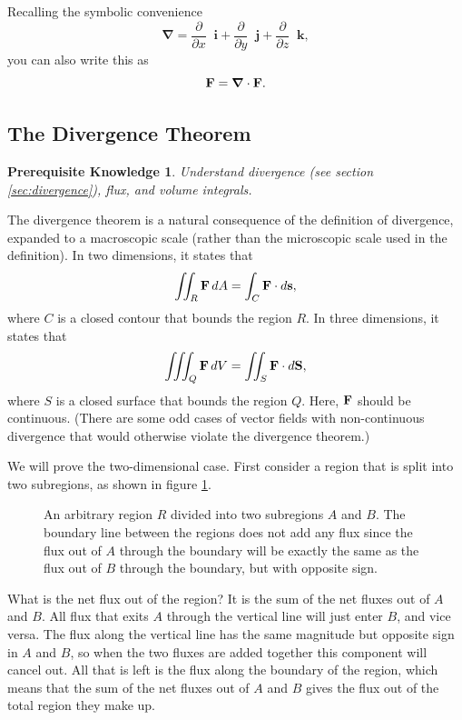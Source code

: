 \documentclass{myarticle}
\let\div\relax
\DeclareMathOperator{\div}{div}
\renewcommand{\vec}[1]{\mathbf{#1}}
\newcommand{\unitvector}[1]{
  \mathop{}\!\vec{#1}
}
\newcommand{\ih}{\unitvector{i}}
\newcommand{\jh}{\unitvector{j}}
\newcommand{\kh}{\unitvector{k}}
\newcommand{\del}{\boldsymbol{\nabla}}
\theoremstyle{nospace}
\newtheorem*{oldprereq}{Prerequisite Knowledge}
\newenvironment{prereq}{\begin{mdframed}\begin{oldprereq}}{\end{oldprereq}\end{mdframed}}
\newtheorem{old series theorem}{Theorem}
\newenvironment{series theorem}{\begin{mdframed}\begin{old series theorem}}{\end{old series theorem}\end{mdframed}}
\begin{document}
Recalling the symbolic convenience \[ \del = \frac{\partial}{\partial x} \ih + \frac{\partial}{\partial y} \jh + \frac{\partial}{\partial z} \kh, \] you can also write this as \[ \div \vec{F} = \del \cdot \vec{F}. \]

\subsection{The Divergence Theorem} \label{sec:divergence theorem}

\begin{prereq} Understand divergence (see section \ref{sec:divergence}), flux, and volume integrals. \end{prereq}

The divergence theorem is a natural consequence of the definition of divergence, expanded to a macroscopic scale (rather than the microscopic scale used in the definition). In two dimensions, it states that \[ \iint_R \div \vec{F} \,dA = \int_C \vec{F} \cdot d\vec{s}, \] where $C$ is a closed contour that bounds the region $R$. In three dimensions, it states that \[ \iiint_Q \div \vec{F} \,dV = \iint_S \vec{F} \cdot d\vec{S}, \] where $S$ is a closed surface that bounds the region $Q$. Here, $\div \vec{F}$ should be continuous. (There are some odd cases of vector fields with non-continuous divergence that would otherwise violate the divergence theorem.)

We will prove the two-dimensional case. First consider a region that is split into two subregions, as shown in figure \ref{fig:divergence theorem}.

\begin{figure}[htb!] \centering
{}
\caption{An arbitrary region $R$ divided into two subregions $A$ and $B$. The boundary line between the regions does not add any flux since the flux out of $A$ through the boundary will be exactly the same as the flux out of $B$ through the boundary, but with opposite sign.}
\label{fig:divergence theorem}
\end{figure}

What is the net flux out of the region? It is the sum of the net fluxes out of $A$ and $B$. All flux that exits $A$ through the vertical line will just enter $B$, and vice versa. The flux along the vertical line has the same magnitude but opposite sign in $A$ and $B$, so when the two fluxes are added together this component will cancel out. All that is left is the flux along the boundary of the region, which means that the sum of the net fluxes out of $A$ and $B$ gives the flux out of the total region they make up.
\end{document}
